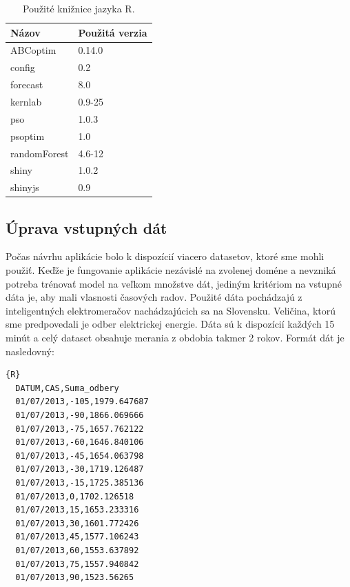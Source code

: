 \documentclass[a4paper,slovak,12pt,appendix]{article}
\begin{document}
\begin{table}[ht]
  \centering
  \caption{Použité knižnice jazyka R.}
  \label{tab-libraries}
  \begin{tabular}{|l|l|}
    \hline
    \textbf{Názov}  &   \textbf{Použitá verzia}  \\ \hline
    ABCoptim        &   0.14.0  \\ \hline
    config          &   0.2     \\ \hline
    forecast        &   8.0     \\ \hline
    kernlab         &   0.9-25  \\ \hline
    pso             &   1.0.3   \\ \hline
    psoptim         &   1.0     \\ \hline
    randomForest    &   4.6-12  \\ \hline
    shiny           &   1.0.2   \\ \hline
    shinyjs         &   0.9     \\ \hline
  \end{tabular}
\end{table}


\subsection{Úprava vstupných dát}
Počas návrhu aplikácie bolo k dispozícií viacero datasetov, ktoré sme mohli
použiť. Keďže je fungovanie aplikácie nezávislé na zvolenej doméne a nevzniká
potreba trénovať model na veľkom množstve dát, jediným kritériom na vstupné
dáta je, aby mali vlasnosti časových radov. Použité dáta pochádzajú
z inteligentných elektromeračov nachádzajúcich sa na Slovensku. Veličina, ktorú
sme predpovedali je odber elektrickej energie. Dáta sú k dispozícií každých
15 minút a celý dataset obsahuje merania z obdobia takmer 2 rokov. Formát
dát je nasledovný:

\begin{lstlisting}{R}
  DATUM,CAS,Suma_odbery
  01/07/2013,-105,1979.647687
  01/07/2013,-90,1866.069666
  01/07/2013,-75,1657.762122
  01/07/2013,-60,1646.840106
  01/07/2013,-45,1654.063798
  01/07/2013,-30,1719.126487
  01/07/2013,-15,1725.385136
  01/07/2013,0,1702.126518
  01/07/2013,15,1653.233316
  01/07/2013,30,1601.772426
  01/07/2013,45,1577.106243
  01/07/2013,60,1553.637892
  01/07/2013,75,1557.940842
  01/07/2013,90,1523.56265
\end{lstlisting}
\end{document}
